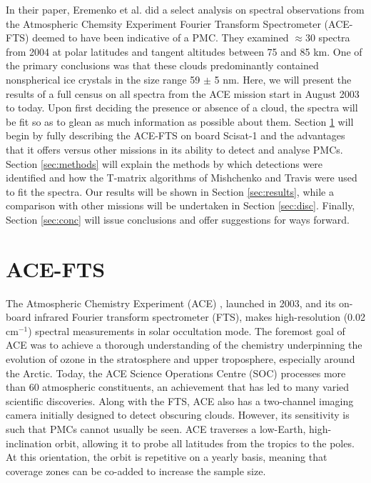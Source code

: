 \documentclass[]{elsarticle}
\begin{document}
In their paper, Eremenko et al.  did a select analysis on spectral observations from the Atmospheric Chemsity Experiment Fourier Transform Spectrometer (ACE-FTS) deemed to have been indicative of a PMC. They examined $\approx$30 spectra from 2004 at polar latitudes and tangent altitudes between 75 and 85 km. One of the primary conclusions was that these clouds predominantly contained nonspherical ice crystals in the size range 59 $\pm$ 5 nm. 
Here, we will present the results of a full census on all spectra from the ACE mission start in August 2003 to today. Upon first deciding the presence or absence of a cloud, the spectra will be fit so as to glean as much information as possible about them. Section \ref{sec:instrument} will begin by fully describing the ACE-FTS on board Scisat-1 and the advantages that it offers versus other missions in its ability to detect and analyse PMCs. Section \ref{sec:methods} will explain the methods by which detections were identified and how the T-matrix algorithms of Mishchenko and Travis \cite{Mishchenko1998} were used to fit the spectra. Our results will be shown in Section \ref{sec:results}, while a comparison with other missions will be undertaken in Section \ref{sec:disc}. Finally, Section \ref{sec:conc} will issue conclusions and offer suggestions for ways forward.
\underline{}
\section{ACE-FTS} \label{sec:instrument}
The Atmospheric Chemistry Experiment (ACE) \cite{Bernath2017} \cite{Bernath2005}, launched in 2003, and its on-board infrared Fourier transform spectrometer (FTS), makes high-resolution (0.02 cm$^{-1}$) spectral measurements in solar occultation mode. The foremost goal of ACE was to achieve a thorough understanding of the chemistry underpinning the evolution of ozone in the stratosphere and upper troposphere, especially around the Arctic. Today, the ACE Science Operations Centre (SOC) processes more than 60 atmospheric constituents, an achievement that has led to many varied scientific discoveries. Along with the FTS, ACE also has a two-channel imaging camera \cite{Gilbert2007} initially designed to detect obscuring clouds. However, its sensitivity is such that PMCs cannot usually be seen. ACE traverses a low-Earth, high-inclination orbit, allowing it to probe all latitudes from the tropics to the poles. At this orientation, the orbit is repetitive on a yearly basis, meaning that coverage zones can be co-added to increase the sample size. 
\end{document}
